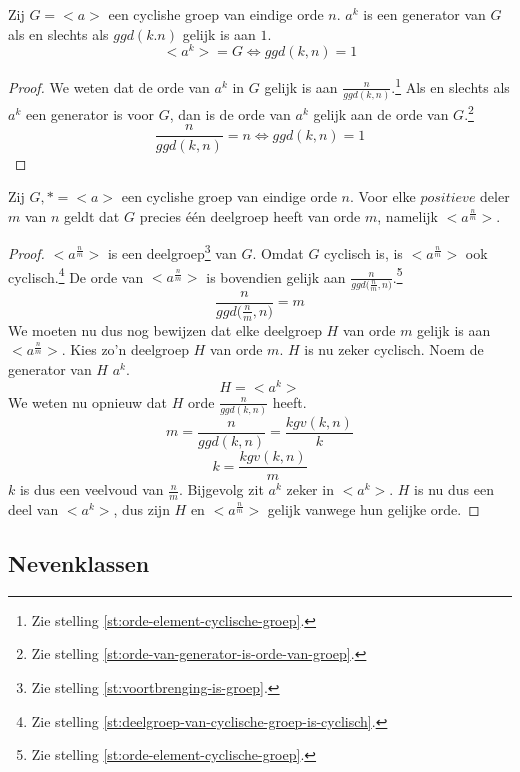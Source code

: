 \documentclass[main.tex]{subfiles}
\begin{document}
\begin{st}
  Zij $G = <a>$ een cyclishe groep van eindige orde $n$.
  $a^{k}$ is een generator van $G$ als en slechts als $ggd(k.n)$ gelijk is aan $1$.
  \[ <a^{k}> = G \Leftrightarrow ggd(k,n) = 1 \]

  \begin{proof}
     We weten dat de orde van $a^{k}$ in $G$ gelijk is aan $\frac{n}{ggd(k,n)}$.\footnote{Zie stelling \ref{st:orde-element-cyclische-groep}.}
     Als en slechts als $a^{k}$ een generator is voor $G$, dan is de orde van $a^{k}$ gelijk aan de orde van $G$.\footnote{Zie stelling \ref{st:orde-van-generator-is-orde-van-groep}.}
     \[ \frac{n}{ggd(k,n)} = n \Leftrightarrow ggd(k,n) = 1 \]
  \end{proof}
\end{st}

\begin{st}
  Zij $G,* = <a>$ een cyclishe groep van eindige orde $n$.
  Voor elke $positieve$ deler $m$ van $n$ geldt dat $G$ precies \'e\'en deelgroep heeft van orde $m$, namelijk $<a^{\frac{n}{m}}>$.
  \begin{proof}
    $<a^{\frac{n}{m}}>$ is een deelgroep\footnote{Zie stelling \ref{st:voortbrenging-is-groep}.} van $G$.
    Omdat $G$ cyclisch is, is $<a^{\frac{n}{m}}>$ ook cyclisch.\footnote{Zie stelling \ref{st:deelgroep-van-cyclische-groep-is-cyclisch}.} De orde van $<a^{\frac{n}{m}}>$ is bovendien gelijk aan $\frac{n}{ggd({\frac{n}{m},n)}}$.\footnote{Zie stelling \ref{st:orde-element-cyclische-groep}.}
    \[ \frac{n}{ggd({\frac{n}{m},n)}} = m \]
    We moeten nu dus nog bewijzen dat elke deelgroep $H$ van orde $m$ gelijk is aan $<a^{\frac{n}{m}}>$.
    Kies zo'n deelgroep $H$ van orde $m$. $H$ is nu zeker cyclisch.
    Noem de generator van $H$ $a^{k}$.
    \[ H = <a^{k}> \]
    We weten nu opnieuw dat $H$ orde $\frac{n}{ggd(k,n)}$ heeft.
    \[ m = \frac{n}{ggd(k,n)} = \frac{kgv(k,n)}{k} \]
    \[ k = \frac{kgv(k,n)}{m} \]
    $k$ is dus een veelvoud van $\frac{n}{m}$.
    Bijgevolg zit $a^{k}$ zeker in $<a^{k}>$.
    $H$ is nu dus een deel van $<a^{k}>$, dus zijn $H$ en $<a^{\frac{n}{m}}>$ gelijk vanwege hun gelijke orde.
  \end{proof}
\end{st}

\subsection{Nevenklassen}
\label{sec:nevenklassen}
\end{document}
